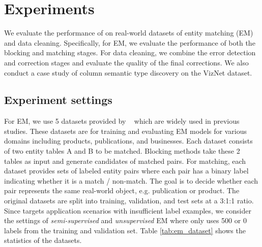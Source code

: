 \section{Experiments}\label{sec:experiment}

We evaluate the performance of \system on real-world datasets of entity matching (EM) and data cleaning.
Specifically, for EM, we evaluate the performance of both the blocking and matching stages. 
For data cleaning, we combine the error detection and correction stages and evaluate the quality of the final corrections.
We also conduct a case study of column semantic type discovery on the VizNet dataset. 

\subsection{Experiment settings}



For EM, we use 5 datasets provided by \dm~\cite{DBLP:conf/sigmod/MudgalLRDPKDAR18} which are widely used in previous studies.
These datasets are for training and evaluating EM models for various domains including products, publications, and businesses.
Each dataset consists of two entity tables A and B to be matched. Blocking methods take these 2 tables as input and
generate candidates of matched pairs.
For matching, each dataset provides sets of labeled entity pairs where each pair has a binary label
indicating whether it is a match / non-match.
The goal is to decide whether each pair represents the same real-world object, e.g. publication or product.
The original datasets are split into training, validation, and test sets 
at a 3:1:1 ratio.
Since \system targets application scenarios with insufficient label examples,
we consider the settings of \emph{semi-supervised} and \emph{unsupervised} EM
where \system only uses 500 or 0 labels from the training and validation set.
Table \ref{tab:em_dataset} shows the statistics of the datasets.



